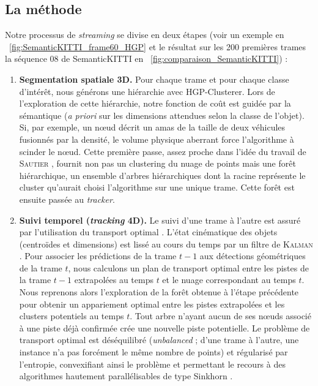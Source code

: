 \subsection{La méthode}
Notre processus de \emph{streaming} se divise en deux étapes (voir un exemple en \Fig~\ref{fig:SemanticKITTI_frame60_HGP} et le résultat sur les 200 premières trames la séquence 08 de SemanticKITTI en \Fig~\ref{fig:comparaison_SemanticKITTI}) :
\begin{enumerate}
    \item \textbf{Segmentation spatiale 3D.} Pour chaque trame et pour chaque classe d'intérêt, nous générons une hiérarchie avec HGP-Clusterer. Lors de l'exploration de cette hiérarchie, notre fonction de coût est guidée par la sémantique (\emph{a priori} sur les dimensions attendues selon la classe de l'objet). Si, par exemple, un nœud décrit un amas de la taille de deux véhicules fusionnés par la densité, le volume physique aberrant force l'algorithme à scinder le nœud.
    Cette première passe, assez proche dans l'idée du travail de \textsc{Sautier} \etal \cite{Sautier2025}, fournit non pas un clustering du nuage de points mais une forêt hiérarchique, un ensemble d'arbres hiérarchiques dont la racine représente le cluster qu'aurait choisi l'algorithme sur une unique trame. Cette forêt est ensuite passée au \emph{tracker}. 
    \item \textbf{Suivi temporel (\emph{tracking} 4D).} Le suivi d'une trame à l'autre est assuré par l'utilisation du transport optimal \cite{Peyre2019}. L'état cinématique des objets (centroïdes et dimensions) est lissé au cours du temps par un filtre de \textsc{Kalman} \cite{FiltreKalman}. Pour associer les prédictions de la trame $t-1$ aux détections géométriques de la trame $t$, nous calculons un plan de transport optimal entre les pistes de la trame $t-1$ extrapolées au temps $t$ et le nuage correspondant au temps $t$. Nous reprenons alors l'exploration de la forêt obtenue à l'étape précédente pour obtenir un appariement optimal entre les pistes extrapolées et les clusters potentiels au temps $t$. Tout arbre n'ayant aucun de ses nœuds associé à une piste déjà confirmée crée une nouvelle piste potentielle. Le problème de transport optimal est déséquilibré \cite{Chizat2018UOT} (\emph{unbalanced} ; d'une trame à l'autre, une instance n'a pas forcément le même nombre de points) et régularisé par l'entropie, convexifiant ainsi le problème et permettant le recours à des algorithmes hautement parallélisables de type Sinkhorn \cite{Cuturi2013Sinkhorn}.
\end{enumerate}

